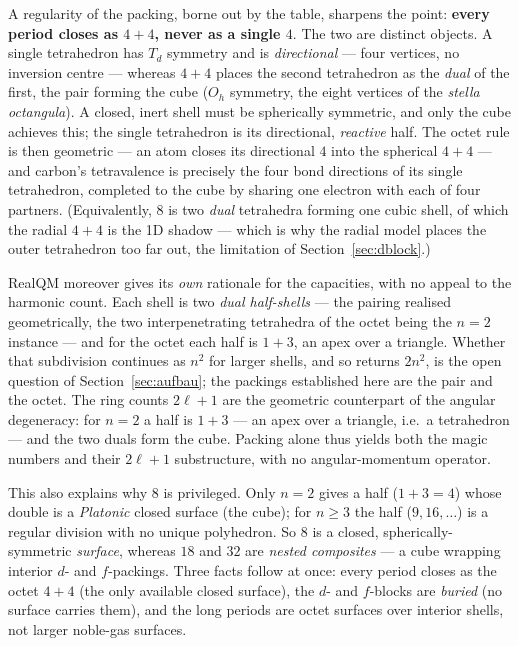 \documentclass[11pt]{article}
\begin{document}
A regularity of the packing, borne out by the table, sharpens the point: \textbf{every
period closes as $4{+}4$, never as a single $4$}. The two are distinct objects. A single
tetrahedron has $T_d$ symmetry and is \emph{directional} --- four vertices, no inversion
centre --- whereas $4{+}4$ places the second tetrahedron as the \emph{dual} of the first,
the pair forming the cube ($O_h$ symmetry, the eight vertices of the \emph{stella
octangula}). A closed, inert shell must be spherically symmetric, and only the cube
achieves this; the single tetrahedron is its directional, \emph{reactive} half. The octet
rule is then geometric --- an atom closes its directional $4$ into the spherical $4{+}4$
--- and carbon's tetravalence is precisely the four bond directions of its single
tetrahedron, completed to the cube by sharing one electron with each of four partners.
(Equivalently, $8$ is two \emph{dual} tetrahedra forming one cubic shell, of which the
radial $4{+}4$ is the 1D shadow --- which is why the radial model places the outer
tetrahedron too far out, the limitation of Section~\ref{sec:dblock}.)

RealQM moreover gives its \emph{own} rationale for the capacities, with no appeal
to the harmonic count. Each shell is two \emph{dual half-shells} --- the pairing realised
geometrically, the two interpenetrating tetrahedra of the octet being the $n=2$ instance
--- and for the octet each half is $1{+}3$, an apex over a triangle. Whether that
subdivision continues as $n^2$ for larger shells, and so returns $2n^2$, is the open question of
Section~\ref{sec:aufbau}; the packings established here are the pair and the octet. The ring counts $2\ell+1$ are the geometric counterpart of the angular
degeneracy: for $n=2$ a half is $1{+}3$ --- an apex over a triangle, i.e.\ a tetrahedron
--- and the two duals form the cube. Packing alone thus yields both the magic numbers and
their $2\ell+1$ substructure, with no angular-momentum operator.

This also explains why $8$ is privileged. Only $n=2$ gives a half ($1{+}3=4$) whose
double is a \emph{Platonic} closed surface (the cube); for $n\ge3$ the half
($9,16,\dots$) is a regular division with no unique polyhedron. So $8$ is a closed,
spherically-symmetric \emph{surface}, whereas $18$ and $32$ are \emph{nested composites}
--- a cube wrapping interior $d$- and $f$-packings. Three facts follow at once: every
period closes as the octet $4{+}4$ (the only available closed surface), the $d$- and
$f$-blocks are \emph{buried} (no surface carries them), and the long periods are octet
surfaces over interior shells, not larger noble-gas surfaces.
\end{document}
